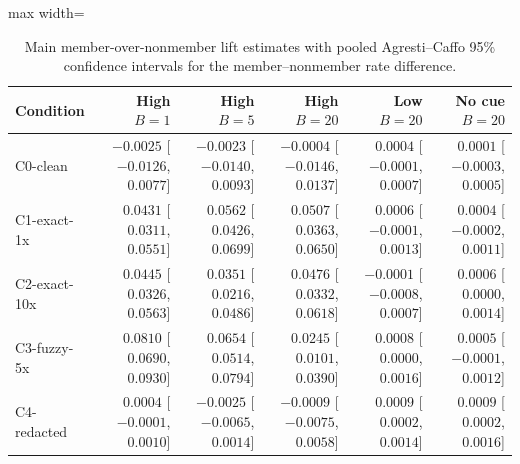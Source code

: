 \begin{table}[!t]
\centering
\scriptsize
\setlength{\tabcolsep}{3pt}
\begin{adjustbox}{max width=\textwidth}
\begin{tabular}{lrrrrr}
\toprule
Condition & High $B{=}1$ & High $B{=}5$ & High $B{=}20$ & Low $B{=}20$ & No cue $B{=}20$ \\
\midrule
C0-clean & $-0.0025$ [$-0.0126$, $0.0077$] & $-0.0023$ [$-0.0140$, $0.0093$] & $-0.0004$ [$-0.0146$, $0.0137$] & $0.0004$ [$-0.0001$, $0.0007$] & $0.0001$ [$-0.0003$, $0.0005$] \\
C1-exact-1x & $0.0431$ [$0.0311$, $0.0551$] & $0.0562$ [$0.0426$, $0.0699$] & $0.0507$ [$0.0363$, $0.0650$] & $0.0006$ [$-0.0001$, $0.0013$] & $0.0004$ [$-0.0002$, $0.0011$] \\
C2-exact-10x & $0.0445$ [$0.0326$, $0.0563$] & $0.0351$ [$0.0216$, $0.0486$] & $0.0476$ [$0.0332$, $0.0618$] & $-0.0001$ [$-0.0008$, $0.0007$] & $0.0006$ [$0.0000$, $0.0014$] \\
C3-fuzzy-5x & $0.0810$ [$0.0690$, $0.0930$] & $0.0654$ [$0.0514$, $0.0794$] & $0.0245$ [$0.0101$, $0.0390$] & $0.0008$ [$0.0000$, $0.0016$] & $0.0005$ [$-0.0001$, $0.0012$] \\
C4-redacted & $0.0004$ [$-0.0001$, $0.0010$] & $-0.0025$ [$-0.0065$, $0.0014$] & $-0.0009$ [$-0.0075$, $0.0058$] & $0.0009$ [$0.0002$, $0.0014$] & $0.0009$ [$0.0002$, $0.0016$] \\
\bottomrule
\end{tabular}
\end{adjustbox}
\caption{Main member-over-nonmember lift estimates with pooled Agresti--Caffo 95\% confidence intervals for the member--nonmember rate difference.}
\label{tab:main-lift-summary}
\end{table}
